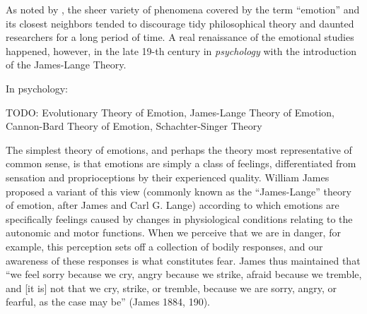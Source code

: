 As noted by \citet{Sousa:14}, the sheer variety of phenomena covered
by the term ``emotion'' and its closest neighbors tended to discourage
tidy philosophical theory and daunted researchers for a long period of
time.  A real renaissance of the emotional studies happened, however,
in the late 19-th century in \emph{psychology} with the introduction
of the James-Lange Theory.

In psychology:

TODO: Evolutionary Theory of Emotion, James-Lange Theory of Emotion,
Cannon-Bard Theory of Emotion, Schachter-Singer Theory

The simplest theory of emotions, and perhaps the theory most
representative of common sense, is that emotions are simply a class of
feelings, differentiated from sensation and proprioceptions by their
experienced quality. William James proposed a variant of this view
(commonly known as the ``James-Lange'' theory of emotion, after James
and Carl G. Lange) according to which emotions are specifically
feelings caused by changes in physiological conditions relating to the
autonomic and motor functions. When we perceive that we are in danger,
for example, this perception sets off a collection of bodily
responses, and our awareness of these responses is what constitutes
fear. James thus maintained that ``we feel sorry because we cry, angry
because we strike, afraid because we tremble, and [it is] not that we
cry, strike, or tremble, because we are sorry, angry, or fearful, as
the case may be'' (James 1884, 190).

